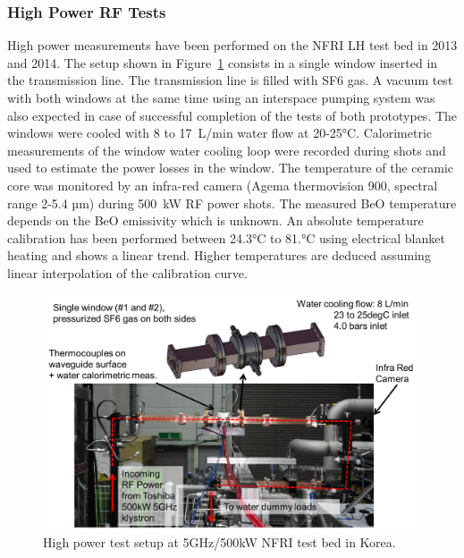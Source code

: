 {\subsubsection{High Power RF Tests}
High power measurements have been performed on the NFRI LH test bed in 2013 and 2014. The setup shown in Figure~\ref{fig:iterwindowsrftests} consists in a single window inserted in the transmission line. The transmission line is filled with SF6 gas. A vacuum test with both windows at the same time using an interspace pumping system was also expected in case of successful completion of the tests of both prototypes. The windows were cooled with 8 to 17~\si{L/min} water flow at 20-25$\si{\degreeCelsius}$. Calorimetric measurements of the window water cooling loop were recorded during shots and used to estimate the power losses in the window. The temperature of the ceramic core was monitored by an infra-red camera (Agema thermovision 900, spectral range 2-5.4 \si{µm}) during 500~kW RF power shots. The measured BeO temperature depends on the BeO emissivity which is unknown. An absolute temperature calibration has been performed between 24.3$\si{\degreeCelsius}$ to 81.$\si{\degreeCelsius}$ using electrical blanket heating and shows a linear trend. Higher temperatures are deduced assuming linear interpolation of the calibration curve. 

\begin{figure}
	\centering
	\includegraphics[width=1.0\linewidth]{figures/chap3/ITER_window/ITER_windows_RF_tests}
	\caption{High power test setup at 5GHz/500kW NFRI test bed in Korea.}
	\label{fig:iterwindowsrftests}
\end{figure}

}
